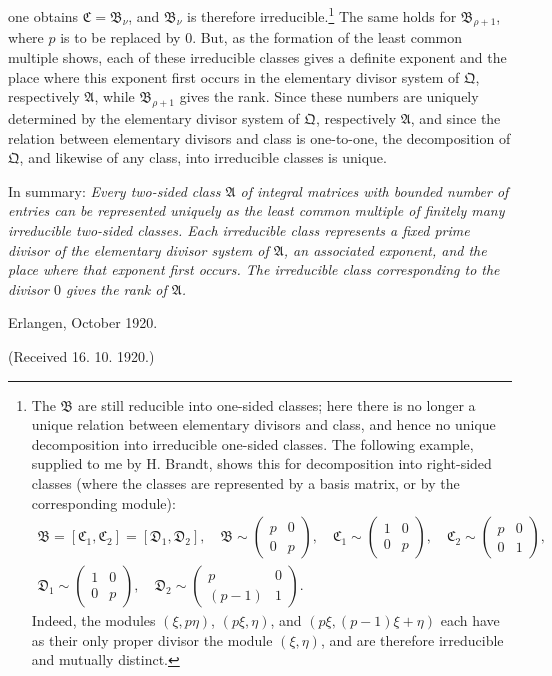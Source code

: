\documentclass[11pt]{article}
\begin{document}
one obtains $\mathfrak C=\mathfrak B_\nu$, and $\mathfrak B_\nu$ is therefore irreducible.\footnote{The $\mathfrak B$ are still reducible into one-sided classes; here there is no longer a unique relation between elementary divisors and class, and hence no unique decomposition into irreducible one-sided classes. The following example, supplied to me by H. Brandt, shows this for decomposition into right-sided classes (where the classes are represented by a basis matrix, or by the corresponding module):
\[
\begin{gathered}
 \mathfrak B=[\mathfrak C_1,\mathfrak C_2]=[\mathfrak D_1,\mathfrak D_2],\quad
 \mathfrak B\sim\begin{pmatrix}p&0\\0&p\end{pmatrix},\quad
 \mathfrak C_1\sim\begin{pmatrix}1&0\\0&p\end{pmatrix},\quad
 \mathfrak C_2\sim\begin{pmatrix}p&0\\0&1\end{pmatrix},\\
 \mathfrak D_1\sim\begin{pmatrix}1&0\\0&p\end{pmatrix},
 \quad
 \mathfrak D_2\sim\begin{pmatrix}p&0\\(p-1)&1\end{pmatrix}.
\end{gathered}
\]
Indeed, the modules $(\xi,p\eta)$, $(p\xi,\eta)$, and $(p\xi,(p-1)\xi+\eta)$ each have as their only proper divisor the module $(\xi,\eta)$, and are therefore irreducible and mutually distinct.} The same holds for $\mathfrak B_{\rho+1}$, where $p$ is to be replaced by $0$. But, as the formation of the least common multiple shows, each of these irreducible classes gives a definite exponent and the place where this exponent first occurs in the elementary divisor system of $\mathfrak Q$, respectively $\mathfrak A$, while $\mathfrak B_{\rho+1}$ gives the rank. Since these numbers are uniquely determined by the elementary divisor system of $\mathfrak Q$, respectively $\mathfrak A$, and since the relation between elementary divisors and class is one-to-one, the decomposition of $\mathfrak Q$, and likewise of any class, into irreducible classes is unique.

In summary: \emph{Every two-sided class $\mathfrak A$ of integral matrices with bounded number of entries can be represented uniquely as the least common multiple of finitely many irreducible two-sided classes. Each irreducible class represents a fixed prime divisor of the elementary divisor system of $\mathfrak A$, an associated exponent, and the place where that exponent first occurs. The irreducible class corresponding to the divisor $0$ gives the rank of $\mathfrak A$.}

\begin{flushleft}
Erlangen, October 1920.
\end{flushleft}
\begin{center}
(Received 16. 10. 1920.)
\end{center}
\end{document}
